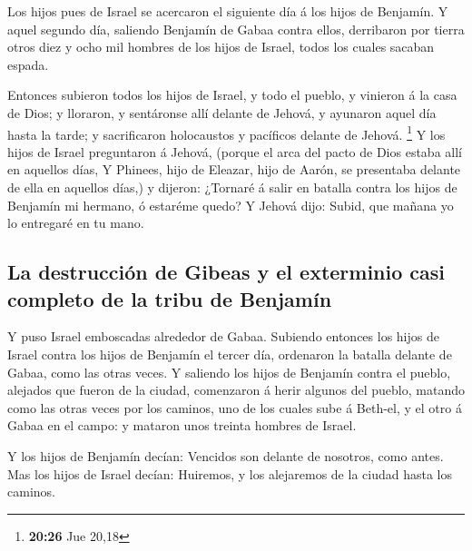  Los hijos pues de Israel se acercaron el siguiente día á
los hijos de Benjamín.  Y aquel segundo día, saliendo
Benjamín de Gabaa contra ellos, derribaron por tierra otros diez y ocho
mil hombres de los hijos de Israel, todos los cuales sacaban espada.

 Entonces subieron todos los hijos de Israel, y todo el
pueblo, y vinieron á la casa de Dios; y lloraron, y sentáronse allí
delante de Jehová, y ayunaron aquel día hasta la tarde; y sacrificaron
holocaustos y pacíficos delante de Jehová. \footnote{\textbf{20:26} Jue
  20,18}  Y los hijos de Israel preguntaron á Jehová,
(porque el arca del pacto de Dios estaba allí en aquellos días,
 Y Phinees, hijo de Eleazar, hijo de Aarón, se presentaba
delante de ella en aquellos días,) y dijeron: ¿Tornaré á salir en
batalla contra los hijos de Benjamín mi hermano, ó estaréme quedo? Y
Jehová dijo: Subid, que mañana yo lo entregaré en tu mano.

\hypertarget{la-destrucciuxf3n-de-gibeas-y-el-exterminio-casi-completo-de-la-tribu-de-benjamuxedn}{%
\subsection{La destrucción de Gibeas y el exterminio casi completo de la
tribu de
Benjamín}\label{la-destrucciuxf3n-de-gibeas-y-el-exterminio-casi-completo-de-la-tribu-de-benjamuxedn}}

 Y puso Israel emboscadas alrededor de Gabaa. 
Subiendo entonces los hijos de Israel contra los hijos de Benjamín el
tercer día, ordenaron la batalla delante de Gabaa, como las otras veces.
 Y saliendo los hijos de Benjamín contra el pueblo,
alejados que fueron de la ciudad, comenzaron á herir algunos del pueblo,
matando como las otras veces por los caminos, uno de los cuales sube á
Beth-el, y el otro á Gabaa en el campo: y mataron unos treinta hombres
de Israel.

 Y los hijos de Benjamín decían: Vencidos son delante de
nosotros, como antes. Mas los hijos de Israel decían: Huiremos, y los
alejaremos de la ciudad hasta los caminos.

